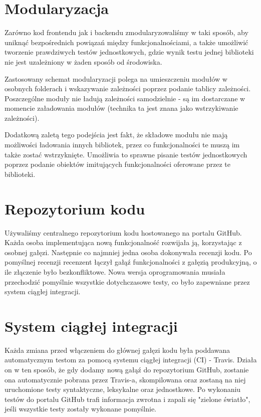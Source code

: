 \documentclass[a4paper,twoside,openright,11pt]{report}
\begin{document}
  \section{Modularyzacja}
\par Zarówno kod frontendu jak i backendu zmodularyzowaliśmy w taki sposób, aby uniknąć bezpośrednich powiązań między funkcjonalnościami, a także umożliwić tworzenie prawdziwych testów
jednostkowych, gdzie wynik testu jednej biblioteki nie jest uzależniony w żaden sposób od środowiska. 
\par Zastosowany schemat modularyzacji polega na umieszczeniu modułów w osobnych folderach i wskazywanie zależności poprzez podanie tablicy zależności. Poszczególne moduły nie ładują zależności samodzielnie - są im dostarczane w momencie załadowania modułów (technika ta jest znana jako wstrzykiwanie zależności).
\par Dodatkową zaletą tego podejścia jest fakt, że składowe modułu nie mają możliwości ładowania innych bibliotek, przez co funkcjonalności te muszą im także zostać wstrzyknięte. Umożliwia to
sprawne pisanie testów jednostkowych poprzez podanie obiektów imitujących funkcjonalności oferowane przez te biblioteki.

  \section{Repozytorium kodu}
\par Używaliśmy centralnego repozytorium kodu hostowanego na portalu GitHub. \cite{repozytorium} Każda osoba implementująca nową funkcjonalność rozwijała ją, korzystając z osobnej gałęzi. Następnie co najmniej jedna osoba dokonywała recenzji kodu. Po pomyślnej recenzji recenzent łączył gałąź funkcjonalności z gałęzią produkcyjną, o ile złączenie było bezkonfliktowe. Nowa wersja oprogramowania musiała przechodzić pomyślnie wszystkie dotychczasowe testy, co było zapewniane przez system ciągłej integracji. 

  \section{System ciągłej integracji}
\par Każda zmiana przed włączeniem do głównej gałęzi kodu była poddawana automatycznym testom za pomocą systemu ciągłej integracji (CI) - Travis. \cite{travis} Działa on w ten sposób, że gdy dodamy nową gałąź do repozytorium GitHub, zostanie ona automatycznie pobrana przez Travis-a, skompilowana oraz zostaną na niej uruchomione testy syntaktyczne, leksykalne oraz jednostkowe. Po wykonaniu testów do portalu GitHub trafi informacja zwrotna i zapali się "zielone światło", jeśli wszystkie testy zostały wykonane pomyślnie. 
\end{document}
